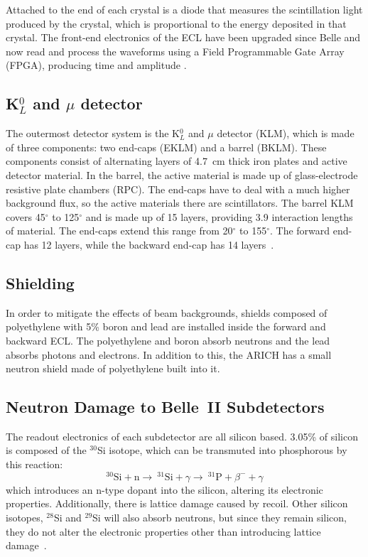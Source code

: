 Attached to the end of each crystal is a diode that measures the scintillation light produced by the crystal, which is proportional to the energy deposited in that crystal. The front-end electronics of the ECL have been upgraded since Belle and now read and process the waveforms using a Field Programmable Gate Array (FPGA), producing time and amplitude \cite{BELLE2TDR}.


\subsection{K$_L^0$ and $\mu$ detector}
\label{sec:KLM}


The outermost detector system is the K$_L^0$ and $\mu$ detector (KLM), which is made of three components: two end-caps (EKLM) and a barrel (BKLM). These components consist of alternating layers of 4.7~cm thick iron plates and active detector material. In the barrel, the active material is made up of glass-electrode resistive plate chambers (RPC). The end-caps have to deal with a much higher background flux, so the active materials there are scintillators. The barrel KLM covers 45$^{\circ}$ to 125$^{\circ}$ and is made up of 15 layers, providing 3.9 interaction lengths of material. The end-caps extend this range from 20$^{\circ}$ to 155$^{\circ}$. The forward end-cap has 12 layers, while the backward end-cap has 14 layers~\cite{BELLE2TDR}.

\subsection{Shielding}

	In order to mitigate the effects of beam backgrounds, shields composed of polyethylene with 5\% boron and lead are installed inside the forward and backward ECL. The polyethylene and boron absorb neutrons and the lead absorbs photons and electrons. In addition to this, the ARICH has a small neutron shield made of polyethylene built into it.

\subsection{Neutron Damage to Belle~II Subdetectors}



	The readout electronics of each subdetector are all silicon based. 3.05\% of silicon is composed of the $^{30}$Si isotope, which can be transmuted into phosphorous by this reaction:
\begin{equation}
	{^{30}\mathrm{Si} + \mathrm{n}\rightarrow~^{31}\mathrm{Si}+\gamma \rightarrow~^{31}\mathrm{P}+\beta^{-}+\gamma}
\end{equation}
which introduces an n-type dopant into the silicon, altering its electronic properties. Additionally, there is lattice damage caused by recoil. Other silicon isotopes, $^{28}$Si and $^{29}$Si will also absorb neutrons, but since they remain silicon, they do not alter the electronic properties other than introducing lattice damage~\cite{young1978radiation}.

